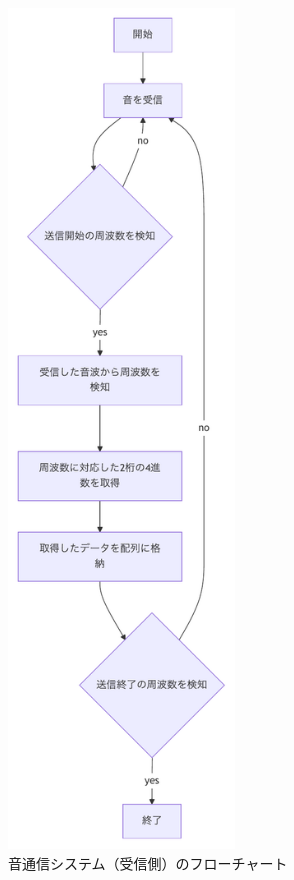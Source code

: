 \documentclass[a4j,11pt,dvipdfmx]{jsarticle}
\begin{document}
\begin{figure}[h]
    \centering
    \includegraphics[width=60mm]{../img/flow_sound_rcv-1.pdf}
    \caption{音通信システム（受信側）のフローチャート}
    \label{fig:flow_sound_rcv}
\end{figure}


\clearpage
\end{document}
